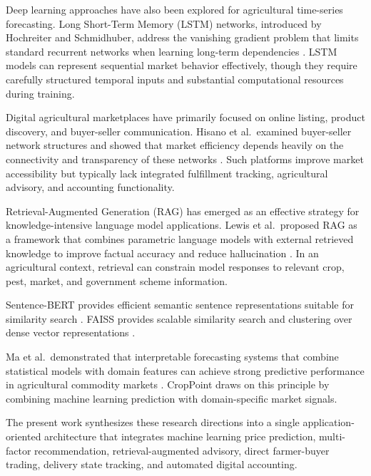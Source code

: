 \documentclass[conference]{IEEEtran}
\begin{document}
Deep learning approaches have also been explored for agricultural
time-series forecasting. Long Short-Term Memory (LSTM) networks,
introduced by Hochreiter and Schmidhuber, address the vanishing
gradient problem that limits standard recurrent networks when
learning long-term dependencies \cite{hochreiter1997}. LSTM models
can represent sequential market behavior effectively, though they
require carefully structured temporal inputs and substantial
computational resources during training.

Digital agricultural marketplaces have primarily focused on online
listing, product discovery, and buyer-seller communication. Hisano
et al.\ examined buyer-seller network structures and showed that
market efficiency depends heavily on the connectivity and
transparency of these networks \cite{hisano2017}. Such platforms
improve market accessibility but typically lack integrated
fulfillment tracking, agricultural advisory, and accounting
functionality.

Retrieval-Augmented Generation (RAG) has emerged as an effective
strategy for knowledge-intensive language model applications. Lewis
et al.\ proposed RAG as a framework that combines parametric
language models with external retrieved knowledge to improve
factual accuracy and reduce hallucination \cite{lewis2020}. In an
agricultural context, retrieval can constrain model responses to
relevant crop, pest, market, and government scheme information.

Sentence-BERT provides efficient semantic sentence representations
suitable for similarity search \cite{reimers2019}. FAISS provides
scalable similarity search and clustering over dense vector
representations \cite{johnson2021}.

Ma et al.\ demonstrated that interpretable forecasting systems that
combine statistical models with domain features can achieve strong
predictive performance in agricultural commodity markets
\cite{ma2018}. CropPoint draws on this principle by combining
machine learning prediction with domain-specific market signals.

The present work synthesizes these research directions into a single
application-oriented architecture that integrates machine learning
price prediction, multi-factor recommendation, retrieval-augmented
advisory, direct farmer-buyer trading, delivery state tracking, and
automated digital accounting.

\end{document}
